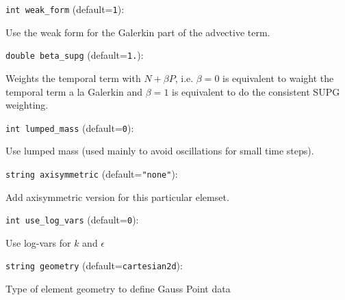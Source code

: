 \item\verb+int weak_form+ {\rm(default=\verb|1|)}:

Use the weak form for the Galerkin part of the advective term. 

\item\verb+double beta_supg+ {\rm(default=\verb|1.|)}:

Weights the temporal term with $N+\beta P$, i.e.
$\beta=0$ is equivalent to waight the temporal term a la 
Galerkin and $\beta=1$ is equivalent to do the consistent SUPG weighting.

\item\verb+int lumped_mass+ {\rm(default=\verb|0|)}:

Use lumped mass (used mainly to avoid oscillations for small time steps).

\item\verb+string axisymmetric+ {\rm(default=\verb|"none"|)}:

Add axisymmetric version for this particular elemset.

\item\verb+int use_log_vars+ {\rm(default=\verb|0|)}:

Use log-vars for $k$ and $\epsilon$

\item\verb+string geometry+ {\rm(default=\verb|cartesian2d|)}:

Type of element geometry to define Gauss Point data

